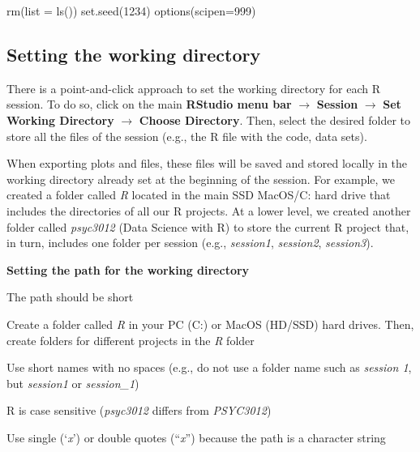 \documentclass[
]{book}
\newenvironment{Shaded}{\begin{snugshade}}{\end{snugshade}}
\newcommand{\AttributeTok}[1]{\textcolor[rgb]{0.77,0.63,0.00}{#1}}
\newcommand{\DecValTok}[1]{\textcolor[rgb]{0.00,0.00,0.81}{#1}}
\newcommand{\FunctionTok}[1]{\textcolor[rgb]{0.00,0.00,0.00}{#1}}
\newcommand{\NormalTok}[1]{#1}
\theoremstyle{definition}
\theoremstyle{definition}
\theoremstyle{definition}
\theoremstyle{definition}
\theoremstyle{remark}
\begin{document}
\begin{Shaded}
\begin{Highlighting}[]

\FunctionTok{rm}\NormalTok{(}\AttributeTok{list =} \FunctionTok{ls}\NormalTok{())}
\FunctionTok{set.seed}\NormalTok{(}\DecValTok{1234}\NormalTok{)  }
\FunctionTok{options}\NormalTok{(}\AttributeTok{scipen=}\DecValTok{999}\NormalTok{)}
\end{Highlighting}
\end{Shaded}

\hypertarget{setting-the-working-directory}{%
\subsection{Setting the working directory}\label{setting-the-working-directory}}

There is a point-and-click approach to set the working directory for each R session. To do so, click on the main \textbf{RStudio menu bar} \(\rightarrow\) \textbf{Session} \(\rightarrow\) \textbf{Set Working Directory} \(\rightarrow\) \textbf{Choose Directory}. Then, select the desired folder to store all the files of the session (e.g., the R file with the code, data sets).

When exporting plots and files, these files will be saved and stored locally in the working directory already set at the beginning of the session. For example, we created a folder called \emph{R} located in the main SSD MacOS/C: hard drive that includes the directories of all our R projects. At a lower level, we created another folder called \emph{psyc3012} (Data Science with R) to store the current R project that, in turn, includes one folder per session (e.g., \emph{session1}, \emph{session2}, \emph{session3}).

\textbf{Setting the path for the working directory}

The path should be short

Create a folder called \emph{R} in your PC (C:) or MacOS (HD/SSD) hard drives. Then, create folders for different projects in the \emph{R} folder

Use short names with no spaces (e.g., do not use a folder name such as \emph{session 1}, but \emph{session1} or \emph{session\_1})

R is case sensitive (\emph{psyc3012} differs from \emph{PSYC3012})

Use single (`\emph{x}') or double quotes (``\emph{x}'') because the path is a character string
\end{document}
